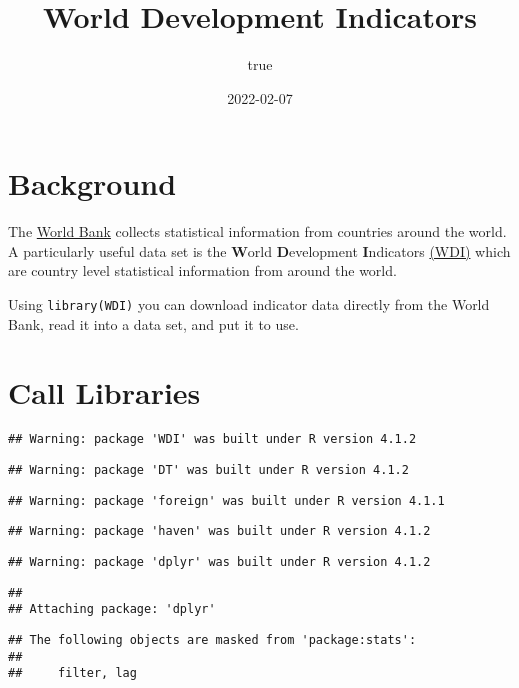 \documentclass[
]{article}
\title{World Development Indicators}
\author{true}
\date{2022-02-07}
\begin{document}
\maketitle

\hypertarget{background}{%
\section{Background}\label{background}}

The \href{http://www.worldbank.org/}{World Bank} collects statistical
information from countries around the world. A particularly useful data
set is the \textbf{W}orld \textbf{D}evelopment \textbf{I}ndicators
\href{http://data.worldbank.org/data-catalog/world-development-indicators}{(WDI)}
which are country level statistical information from around the world.

Using \texttt{library(WDI)} you can download indicator data directly
from the World Bank, read it into a data set, and put it to use.

\hypertarget{call-libraries}{%
\section{Call Libraries}\label{call-libraries}}

\begin{verbatim}
## Warning: package 'WDI' was built under R version 4.1.2
\end{verbatim}

\begin{verbatim}
## Warning: package 'DT' was built under R version 4.1.2
\end{verbatim}

\begin{verbatim}
## Warning: package 'foreign' was built under R version 4.1.1
\end{verbatim}

\begin{verbatim}
## Warning: package 'haven' was built under R version 4.1.2
\end{verbatim}

\begin{verbatim}
## Warning: package 'dplyr' was built under R version 4.1.2
\end{verbatim}

\begin{verbatim}
## 
## Attaching package: 'dplyr'
\end{verbatim}

\begin{verbatim}
## The following objects are masked from 'package:stats':
## 
##     filter, lag
\end{verbatim}
\end{document}
